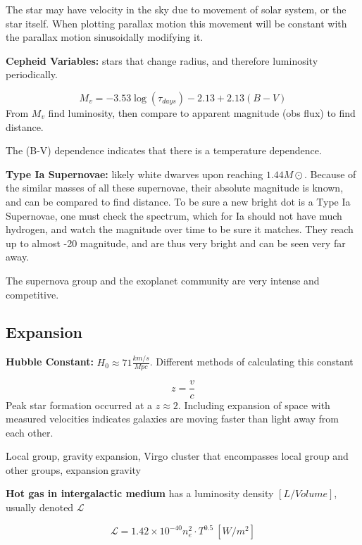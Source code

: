 The star may have velocity in the sky due to movement of solar system, or the star itself. When plotting parallax motion this movement will be constant with the parallax motion sinusoidally modifying it. 

\hfill
\hfill


\textbf{Cepheid Variables: } stars that change radius, and therefore luminosity periodically. 

\begin{equation}
	\label{}
	M_{v}=-3.53\log(\tau_{days})-2.13+2.13(B-V)
\end{equation}
From $M_{v}$ find luminosity, then compare to apparent magnitude (obs flux) to find distance.

The (B-V) dependence indicates that there is a temperature dependence.


\hfill
\hfill

\textbf{Type Ia Supernovae: } likely white dwarves upon reaching $1.44M\odot$. Because of the similar masses of all these supernovae, their absolute magnitude is known, and can be compared to find distance. To be sure a new bright dot is a Type Ia Supernovae, one must check the spectrum, which for Ia should not have much hydrogen, and watch the magnitude over time to be sure it matches. They reach up to almost -20 magnitude, and are thus very bright and can be seen very far away. 

The supernova group and the exoplanet community are very intense and competitive.

\subsection{Expansion}
\textbf{Hubble Constant: }$H_{0}\approx71\frac{km/s}{Mpc}$. Different methods of calculating this constant


\begin{equation}
	\label{}
	z=\frac{v}{c}
\end{equation}
Peak star formation occurred at a $z\approx 2$. Including expansion of space with measured velocities indicates galaxies are moving faster than light away from each other.

Local group, gravity$\>$expansion, Virgo cluster that encompasses local group and other groups, expansion$\>$gravity


\textbf{Hot gas in intergalactic medium } has a luminosity density $[L/Volume]$, usually denoted $\mathcal{L}$


\begin{equation}
	\label{}
	\mathcal{L}=1.42 \times 10^{-40}n_{e}^{2}\cdot T^{0.5}\ [W/m^{2}]
\end{equation}



